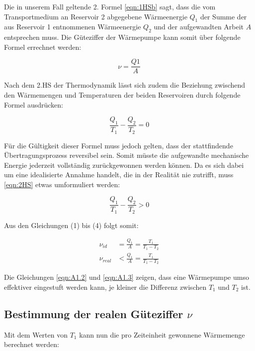 Die in unserem Fall geltende 2. Formel \eqref{eqn:1HSb} sagt, dass die vom Transportmedium an Reservoir 2 abgegebene
Wärmeenergie $Q_1$ der Summe der aus Reservoir 1 entnommenen Wärmeenergie $Q_2$ und der aufgewandten Arbeit $A$
entsprechen muss. Die Güteziffer der Wärmepumpe kann somit über folgende Formel errechnet werden:

\begin{equation}
  \nu = \frac{Q1}{A}
\end{equation}

Nach dem 2.HS der Thermodynamik lässt sich zudem die Beziehung zwischend den Wärmemengen und Temperaturen der
beiden Reservoiren durch folgende Formel ausdrücken:

\begin{equation}
  \label{eqn:2HS}
  \frac{Q_1}{T_1} - \frac{Q_2}{T_2} = 0
\end{equation}

Für die Gültigkeit dieser Formel muss jedoch gelten, dass der stattfindende Übertragungsprozess reversibel sein.
Somit müsste die aufgewandte mechanische Energie jederzeit vollständig zurückgewonnen werden können. Da es
sich dabei um eine idealisierte Annahme handelt, die in der Realität nie zutrifft, muss \eqref{eqn:2HS} etwas
umformuliert werden:

\begin{equation}
  \label{eqn:2HS1}
  \frac{Q_1}{T_1} - \frac{Q_2}{T_2} > 0
\end{equation}

Aus den Gleichungen (1) bis (4) folgt somit:

\begin{align}
  \nu_{id}   &= \frac{Q_1}{A} = \frac{T_1}{T_1 - T_2} \label{eqn:A1.2} \\
  \nu_{real} &< \frac{Q_1}{A} = \frac{T_1}{T_1 - T_2} \label{eqn:A1.3}
\end{align}

Die Gleichungen \eqref{eqn:A1.2} und \eqref{eqn:A1.3} zeigen, dass eine Wärmepumpe umso effektiver eingestuft werden
kann, je kleiner die Differenz zwischen $T_1$ und $T_2$ ist.

\subsection{Bestimmung der realen Güteziffer \texorpdfstring{$\nu$}{z}}

Mit dem Werten von $T_1$ kann nun die pro Zeiteinheit gewonnene Wärmemenge berechnet werden:

